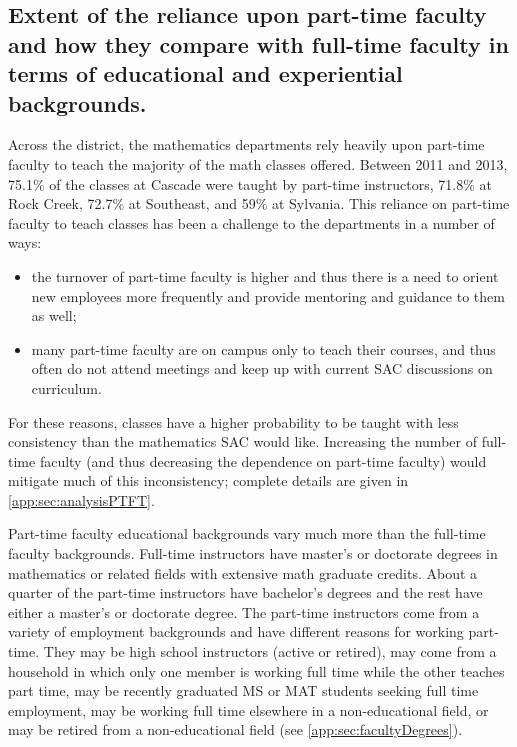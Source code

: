 \subsection[Part-time faculty]{Extent of the reliance upon part-time faculty and how they compare
with full-time faculty in terms of educational and experiential backgrounds.}
Across the district, the mathematics departments rely heavily upon part-time
faculty to teach the majority of the math classes offered.  Between 2011 and
2013, 75.1\% of the classes at Cascade were taught by part-time instructors,
71.8\% at Rock Creek, 72.7\% at Southeast, and 59\% at Sylvania.  This reliance
on part-time faculty to teach classes has been a challenge to the departments
in a number of ways:
\begin{itemize}
	\item the turnover of part-time faculty is higher and
	thus there is a need to orient new employees more frequently and provide
	mentoring and guidance to them as well;
	\item many part-time faculty are on
	campus only to teach their courses, and thus often do not attend meetings and
	keep up with current SAC discussions on curriculum.
\end{itemize}
For these reasons, classes have a higher probability to be taught with less consistency than the
mathematics SAC would like.  Increasing the number of full-time faculty (and
thus decreasing the dependence on part-time faculty) would mitigate much of
this inconsistency; complete details are given in  \vref{app:sec:analysisPTFT}.

Part-time faculty educational backgrounds vary much more than the full-time
faculty backgrounds.  Full-time instructors have master's or doctorate degrees
in mathematics or related fields with extensive math graduate credits.  About a
quarter of the part-time instructors have bachelor's degrees and the rest have
either a master's or doctorate degree.  The part-time instructors come from a
variety of employment backgrounds and have different reasons for working
part-time.  They may be high school instructors (active or retired), may come
from a household in which only one member is working full time while the other
teaches part time, may be recently graduated MS or MAT students seeking full
time employment, may be working full time elsewhere in a non-educational field,
or may be retired from a non-educational field (see
\vref{app:sec:facultyDegrees}).

